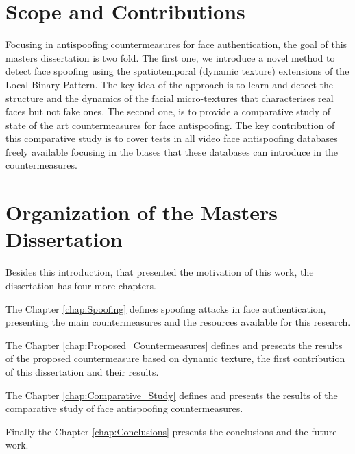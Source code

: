 \section{Scope and Contributions}
\label{sec:scope}

Focusing in antispoofing countermeasures for face authentication, the goal of this masters dissertation is two fold. The first one, we introduce a novel method to detect face spoofing using the spatiotemporal (dynamic texture) extensions of the Local Binary Pattern. The key idea of the approach is to learn and detect the structure and the dynamics of the facial micro-textures that characterises real faces but not fake ones. The second one, is to provide a comparative study of state of the art countermeasures for face antispoofing. The key contribution of this comparative study is to cover tests in all video face antispoofing databases freely available focusing in the biases that these databases can introduce in the countermeasures.

\section{Organization of the Masters Dissertation}
\label{sec:scope}

Besides this introduction, that presented the motivation of this work, the dissertation has four more chapters. 

The Chapter \ref{chap:Spoofing} defines spoofing attacks in face authentication, presenting the main countermeasures and the resources available for this research.

The Chapter \ref{chap:Proposed_Countermeasures} defines and presents the results of the proposed countermeasure based on dynamic texture, the first contribution of this dissertation and their results.

The Chapter \ref{chap:Comparative_Study} defines and presents the results of the comparative study of face antispoofing countermeasures.

Finally the Chapter \ref{chap:Conclusions} presents the conclusions and the future work.
